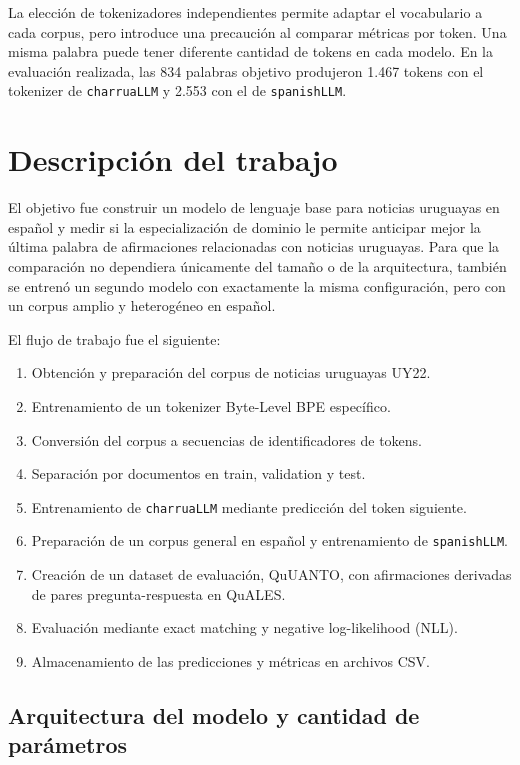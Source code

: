 \documentclass[11pt,a4paper]{article}
\newcommand{\charrua}{\texttt{charruaLLM}}
\newcommand{\spanishmodel}{\texttt{spanishLLM}}
\begin{document}
La elección de tokenizadores independientes permite adaptar el vocabulario a
cada corpus, pero introduce una precaución al comparar métricas por token. Una
misma palabra puede tener diferente cantidad de tokens en cada modelo. En la
evaluación realizada, las 834 palabras objetivo produjeron 1.467 tokens con el
tokenizer de \charrua{} y 2.553 con el de \spanishmodel.


\section{Descripción del trabajo}

El objetivo fue construir un modelo de lenguaje base para noticias uruguayas en
español y medir si la especialización de dominio le permite anticipar mejor la
última palabra de afirmaciones relacionadas con noticias uruguayas. Para que la
comparación no dependiera únicamente del tamaño o de la arquitectura, también
se entrenó un segundo modelo con exactamente la misma configuración, pero con
un corpus amplio y heterogéneo en español.

El flujo de trabajo fue el siguiente:

\begin{enumerate}
    \item  Obtención y preparación del corpus  de noticias uruguayas UY22.
    \item Entrenamiento de un tokenizer Byte-Level BPE específico.
    \item Conversión del corpus a secuencias de identificadores de tokens.
    \item Separación por documentos en train, validation y test.
    \item Entrenamiento de \charrua{} mediante predicción del token siguiente.
    \item Preparación de un corpus general en español y entrenamiento de
          \spanishmodel.
    \item Creación de un dataset de evaluación, QuUANTO, con afirmaciones derivadas
    de pares pregunta-respuesta en QuALES.
    \item Evaluación mediante exact matching y negative log-likelihood (NLL).
    \item Almacenamiento de las predicciones y métricas en archivos CSV.
\end{enumerate}


\subsection{Arquitectura del modelo y cantidad de parámetros}
\end{document}
